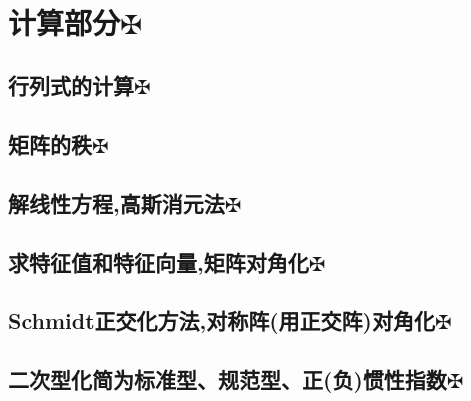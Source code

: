 \documentclass[11pt, a4paper, UTF8]{ctexart}
\begin{document}
\indent\\
\large
\raggedright
\def\fuck{\maltese}
\def\shit#1{#1\protect\hyperlink{catalog}{$\fuck$}}
\hypertarget{catalog}{}
\tableofcontents
\setcounter{secnumdepth}{-1}
\section{\shit{计算部分}}
\subsection{\shit{行列式的计算}}
\subsection{\shit{矩阵的秩}}
\subsection{\shit{解线性方程,高斯消元法}}
\subsection{\shit{求特征值和特征向量,矩阵对角化}}
\subsection{\shit{Schmidt正交化方法,对称阵(用正交阵)对角化}}
\subsection{\shit{二次型化简为标准型、规范型、正(负)惯性指数}}
\end{document}
